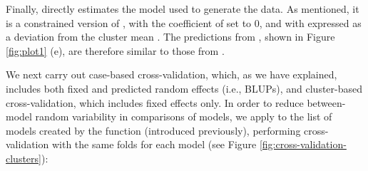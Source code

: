 \documentclass[
]{jss}
\begin{document}
Finally,  directly estimates the model used to generate the
data. As mentioned, it is a constrained version of , with
the coefficient of  set to 0, and with  expressed as a
deviation from the cluster mean . The predictions from
, shown in Figure \ref{fig:plot1} (e), are therefore similar
to those from .

We next carry out case-based cross-validation, which, as we have
explained, includes both fixed and predicted random effects (i.e.,
BLUPs), and cluster-based cross-validation, which includes fixed effects
only. In order to reduce between-model random variability in comparisons
of models, we apply  to the list of models created by the
 function (introduced previously), performing
cross-validation with the same folds for each model (see Figure
\ref{fig:cross-validation-clusters}):
\end{document}
